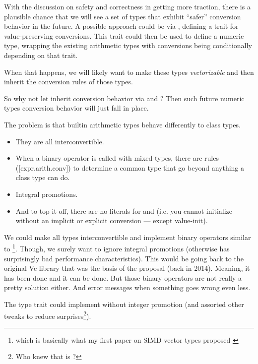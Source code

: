 With the discussion on safety and correctness in \CC{} getting more traction,
there is a plausible chance that we will see a set of types that exhibit
``safer'' conversion behavior in the future.
A possible approach could be via \cite{P2509R0}, defining a trait for
value-preserving conversions.
This trait could then be used to define a numeric type, wrapping the existing
arithmetic types with conversions being conditionally  depending
on that trait.

When that happens, we will likely want to make these types \emph{vectorizable}
and then inherit the conversion rules of those types.

So why not let  inherit conversion behavior via
\std{} and \std{}?
Then such future numeric types conversion behavior will just fall in place.

The problem is that builtin arithmetic types behave differently to class types.
\begin{itemize}
  \item They are all interconvertible.
  \item When a binary operator is called with mixed types, there are rules
    ([expr.arith.conv]) to determine a common type that go beyond anything a
    class type can do.
  \item Integral promotions.
  \item And to top it off, there are no literals for  and
     (i.e. you cannot initialize without an implicit or
    explicit conversion --- except value-init).
\end{itemize}

We could make all  types interconvertible and implement binary
operators similar to \footnote{which is basically what my first paper on SIMD vector types
proposed \cite{N4184}}.
Though, we surely want to ignore integral promotions (otherwise
 has surprisingly bad performance
characteristics).
This would be going back to the original Vc library that was the basis of the
 proposal (back in 2014).
Meaning, it has been done and it can be done.
But those binary operators are not really a pretty solution either.
And error messages when something goes wrong even less.

The type trait  could implement
 without integer promotion (and assorted other tweaks to
reduce surprises\footnote{Who knew that
 is
?}).


